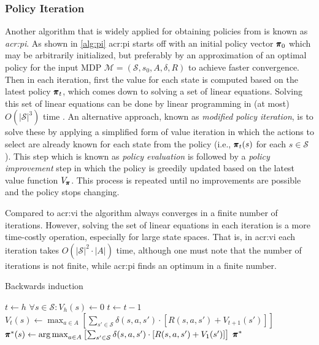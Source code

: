 \subsubsection{Policy Iteration}
\label{sec:policy-iteration}

Another algorithm that is widely applied for obtaining policies from  is known as \textit{\acrfull{acr:pi}}. As shown in \autoref{alg:pi} \acrshort{acr:pi} starts off with an initial policy vector $\pmb{\pi}_0$ which may be arbitrarily initialized, but preferably by an approximation of an optimal policy for the input MDP $\mathcal{M} = (\mathcal{S}, s_0, A, \delta, R)$ to achieve faster convergence.
Then in each iteration, first the value for each state is computed based on the latest policy $\pmb{\pi}_t$, which comes down to solving a set of linear equations.
Solving this set of linear equations can be done by linear programming in (at most) $O(\lvert\mathcal{S}\rvert^3)$ time \cite{littman1995complexity}. 
An alternative approach, known as \textit{modified policy iteration}, is to solve these by applying a simplified form of value iteration in which the actions to select are already known for each state from the policy (i.e., $\pmb{\pi}_t(s)$ for each $s \in \mathcal{S}$).
This step which is known as \textit{policy evaluation} is followed by a \textit{policy improvement} step in which the policy is greedily updated based on the latest value function $V_{\pmb{\pi}}$.
This process is repeated until no improvements are possible and the policy stops changing.

Compared to \acrshort{acr:vi} the algorithm always converges in a finite number of iterations. However, solving the set of linear equations in each iteration is a more time-costly operation, especially for large state spaces.
That is, in \acrshort{acr:vi} each iteration takes $O(\lvert\mathcal{S}\rvert^2\cdot\lvert A\rvert)$ time, although one must note that the number of iterations is not finite, while \acrshort{acr:pi} finds an optimum in a finite number.\newpage

\begin{algorithm}
	\caption{Backwards induction}
	\label{alg:backwards-induction}
	\begin{algorithmic}[1]
		\State $t \gets h$
		\State $\forall s \in \mathcal{S}: V_h(s) \gets 0$
		\Repeat
		\State $t \gets t - 1$
		\State $V_t(s) \gets \max_{a \in A} \left[\sum_{s' \in \mathcal{S}} \delta(s,a,s') \cdot \left[R(s,a,s') + V_{t+1}(s')\right]\right]$
		\EndFor
		\State $\pmb{\pi}^*(s) \gets \operatorname*{arg\,max}_{a \in A} \left[\sum_{s' \in \mathcal{S}} \delta(s,a,s') \cdot \left[R(s,a,s') + V_{1}(s')\right]\right]$
		\EndFor
		\State\Return $\pmb{\pi}^*$
	\end{algorithmic}
\end{algorithm}


